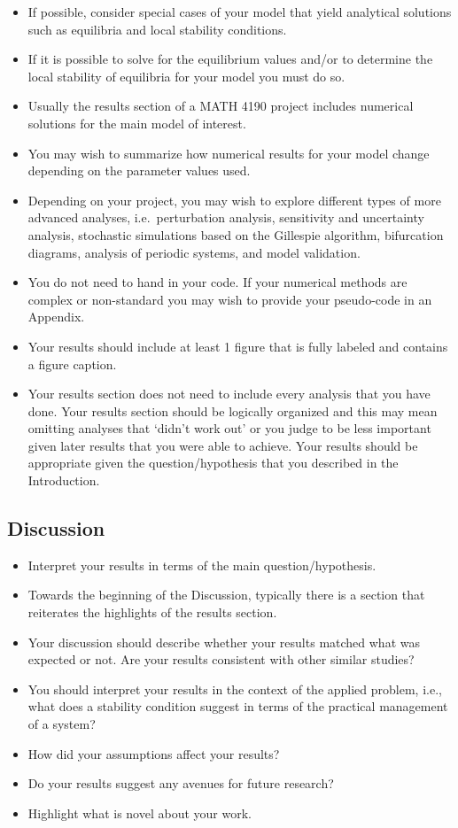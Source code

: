 \documentclass[]{book}
\providecommand{\tightlist}{%
  \setlength{\itemsep}{0pt}\setlength{\parskip}{0pt}}
\begin{document}
\begin{itemize}
\tightlist
\item
  If possible, consider special cases of your model that yield
  analytical solutions such as equilibria and local stability
  conditions.
\item
  If it is possible to solve for the equilibrium values and/or to
  determine the local stability of equilibria for your model you must do
  so.
\item
  Usually the results section of a MATH 4190 project includes numerical
  solutions for the main model of interest.
\item
  You may wish to summarize how numerical results for your model change
  depending on the parameter values used.
\item
  Depending on your project, you may wish to explore different types of
  more advanced analyses, i.e.~perturbation analysis, sensitivity and
  uncertainty analysis, stochastic simulations based on the Gillespie
  algorithm, bifurcation diagrams, analysis of periodic systems, and
  model validation.
\item
  You do not need to hand in your code. If your numerical methods are
  complex or non-standard you may wish to provide your pseudo-code in an
  Appendix.
\item
  Your results should include at least 1 figure that is fully labeled
  and contains a figure caption.
\item
  Your results section does not need to include every analysis that you
  have done. Your results section should be logically organized and this
  may mean omitting analyses that `didn't work out' or you judge to be
  less important given later results that you were able to achieve. Your
  results should be appropriate given the question/hypothesis that you
  described in the Introduction.
\end{itemize}

\subsection{Discussion}\label{discussion}

\begin{itemize}
\tightlist
\item
  Interpret your results in terms of the main question/hypothesis.
\item
  Towards the beginning of the Discussion, typically there is a section
  that reiterates the highlights of the results section.
\item
  Your discussion should describe whether your results matched what was
  expected or not. Are your results consistent with other similar
  studies?
\item
  You should interpret your results in the context of the applied
  problem, i.e., what does a stability condition suggest in terms of the
  practical management of a system?
\item
  How did your assumptions affect your results?
\item
  Do your results suggest any avenues for future research?
\item
  Highlight what is novel about your work.
\end{itemize}
\end{document}
